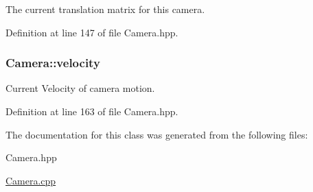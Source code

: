 The current translation matrix for this camera. 



Definition at line 147 of file Camera.\-hpp.

\hypertarget{class_camera_a5b95c890f213db50f321380108b17ea1}{
\subsubsection[{velocity}]{ Camera\-::velocity\hspace{0.3cm}{\ttfamily [private]}}}\label{class_camera_a5b95c890f213db50f321380108b17ea1}


Current Velocity of camera motion. 



Definition at line 163 of file Camera.\-hpp.



The documentation for this class was generated from the following files\-:\begin{DoxyCompactItemize}
\item 
Camera.\-hpp\item 
\hyperlink{_camera_8cpp}{Camera.\-cpp}\end{DoxyCompactItemize}
